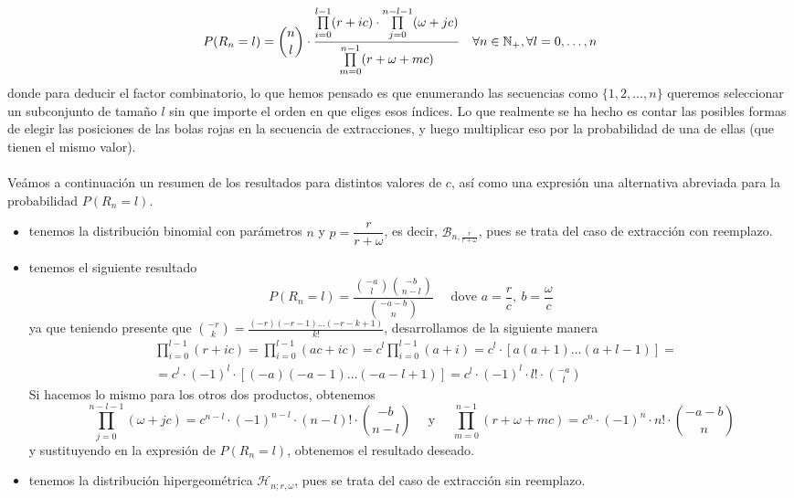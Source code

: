 \begin{ejemplo}
    \begin{equation*}
        P(R_n=l) = \binom{n}{l} \cdot \dfrac{\prod\limits_{i=0}^{l-1} (r + ic) \cdot \prod\limits_{j=0}^{n-l-1} (\omega + jc)}{\prod\limits_{m=0}^{n-1} (r + \omega + mc)} \quad \forall n\in \mathbb{N}_+, \forall l=0, \ldots, n
    \end{equation*}
    donde para deducir el factor combinatorio, lo que hemos pensado es que enumerando las secuencias como $\{1,2, \ldots, n\}$ queremos seleccionar un subconjunto de tamaño $l$ sin que importe el orden en que eliges esos índices. Lo que realmente se ha hecho es contar las posibles formas de elegir las posiciones de las bolas rojas en la secuencia de extracciones, y luego multiplicar eso por la probabilidad de una de ellas (que tienen el mismo valor). \\ \\
    \noindent
    Veámos a continuación un resumen de los resultados para distintos valores de $c$, así como una expresión una alternativa abreviada para la probabilidad $P(R_n=l)$.
    \begin{itemize}
        \item {} tenemos la distribución binomial con parámetros $n$ y $p=\dfrac{r}{r+\omega}$, es decir, $\mathcal{B}_{n, \frac{r}{r+\omega}}$, pues se trata del caso de extracción con reemplazo.
        \item {} tenemos el siguiente resultado
        \begin{equation*}
            P(R_n = l) = \frac{\binom{-a}{l} \binom{-b}{n-l}}{\binom{-a-b}{n}} \quad \text{ dove } a=\dfrac{r}{c}, \ b=\dfrac{\omega}{c}
        \end{equation*}
        ya que teniendo presente que $\binom{-r}{k} = \frac{(-r)(-r-1)\dots(-r-k+1)}{k!}$, desarrollamos de la siguiente manera
        \begin{align*}
            &\prod_{i=0}^{l-1} (r + ic) = \prod_{i=0}^{l-1} (ac + ic) = c^l \prod_{i=0}^{l-1} (a + i) = c^l \cdot [a(a+1)\dots(a+l-1)] =\\
            &=c^l \cdot (-1)^l \cdot [(-a)(-a-1)\dots(-a-l+1)]= c^l \cdot (-1)^l \cdot l! \cdot \binom{-a}{l}
        \end{align*}
        Si hacemos lo mismo para los otros dos productos, obtenemos
        \begin{equation*}
            \prod_{j=0}^{n-l-1} (\omega + jc) = c^{n-l} \cdot (-1)^{n-l} \cdot (n-l)! \cdot \binom{-b}{n-l} \quad  \text{ y } \quad \prod_{m=0}^{n-1} (r + \omega + mc) = c^n \cdot (-1)^n \cdot n! \cdot \binom{-a-b}{n}
        \end{equation*}
        y sustituyendo en la expresión de $P(R_n=l)$, obtenemos el resultado deseado.
        \item {} tenemos la distribución hipergeométrica $\mathcal{H}_{n; r, \omega}$, pues se trata del caso de extracción sin reemplazo.
    \end{itemize}
\end{ejemplo}

